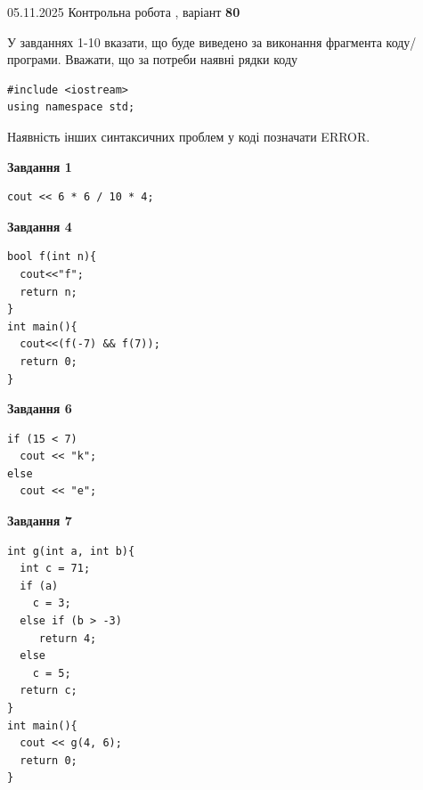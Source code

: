 \documentclass[12pt, ukrainian]{article}
\begin{document}
{\Large{05.11.2025 Контрольна робота , варіант  \No \textbf { 80 }\par}}
{
\begin {large}
У завданнях 1-10 вказати, що буде виведено за виконання фрагмента коду/про\-гра\-ми.
Вважати, що за потреби наявні рядки коду
\begin{verbatim}
#include <iostream>
using namespace std;
\end{verbatim}
Наявність інших синтаксичних проблем у коді позначати ERROR.

\begin{minipage}[t]{7.0cm}

\begin{center}
\textbf{Завдання 1}
\end{center}
\vspace{-8mm}

\begin{verbatim}
cout << 6 * 6 / 10 * 4;
\end{verbatim}



\begin{center}
\textbf{Завдання 4}
\end{center}
\vspace{-8mm}

\begin{verbatim}
bool f(int n){
  cout<<"f";
  return n;
}
int main(){
  cout<<(f(-7) && f(7));
  return 0;
}
\end{verbatim}



\begin{center}
\textbf{Завдання 6}
\end{center}
\vspace{-8mm}

\begin{verbatim}
if (15 < 7)
  cout << "k";
else
  cout << "e";
\end{verbatim}



\begin{center}
\textbf{Завдання 7}
\end{center}
\vspace{-8mm}

\begin{verbatim}
int g(int a, int b){
  int c = 71;
  if (a)
    c = 3;
  else if (b > -3)
     return 4;
  else
    c = 5;
  return c;
}
int main(){
  cout << g(4, 6);
  return 0;
}
\end{verbatim}


\end{minipage}
\end{large}}
\end{document}
